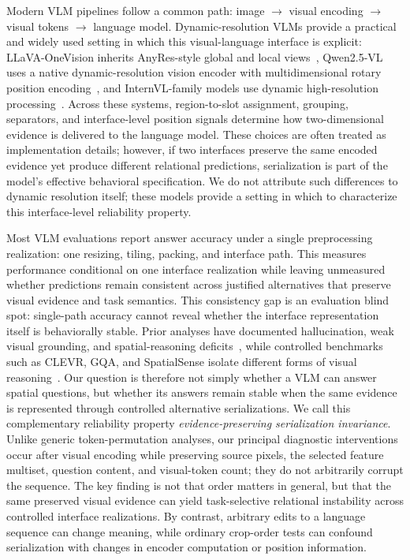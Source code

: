 \documentclass[10pt,twocolumn,letterpaper]{article}
\begin{document}
Modern VLM pipelines follow a common path: image $\rightarrow$ visual encoding $\rightarrow$ visual tokens $\rightarrow$ language model.
Dynamic-resolution VLMs provide a practical and widely used setting in which this visual-language interface is explicit: LLaVA-OneVision inherits AnyRes-style global and local views~\cite{li2024llavaonevision}, Qwen2.5-VL uses a native dynamic-resolution vision encoder with multidimensional rotary position encoding~\cite{bai2025qwen25vl}, and InternVL-family models use dynamic high-resolution processing~\cite{chen2024internvl}.
Across these systems, region-to-slot assignment, grouping, separators, and interface-level position signals determine how two-dimensional evidence is delivered to the language model.
These choices are often treated as implementation details; however, if two interfaces preserve the same encoded evidence yet produce different relational predictions, serialization is part of the model's effective behavioral specification.
We do not attribute such differences to dynamic resolution itself; these models provide a setting in which to characterize this interface-level reliability property.

Most VLM evaluations report answer accuracy under a single preprocessing realization: one resizing, tiling, packing, and interface path.
This measures performance conditional on one interface realization while leaving unmeasured whether predictions remain consistent across justified alternatives that preserve visual evidence and task semantics.
This consistency gap is an evaluation blind spot: single-path accuracy cannot reveal whether the interface representation itself is behaviorally stable.
Prior analyses have documented hallucination, weak visual grounding, and spatial-reasoning deficits~\cite{tong2024eyes,chen2024spatialvlm}, while controlled benchmarks such as CLEVR, GQA, and SpatialSense isolate different forms of visual reasoning~\cite{johnson2017clevr,hudson2019gqa,yang2019spatialsense}.
Our question is therefore not simply whether a VLM can answer spatial questions, but whether its answers remain stable when the same evidence is represented through controlled alternative serializations.
We call this complementary reliability property \emph{evidence-preserving serialization invariance}.
Unlike generic token-permutation analyses, our principal diagnostic interventions occur after visual encoding while preserving source pixels, the selected feature multiset, question content, and visual-token count; they do not arbitrarily corrupt the sequence.
The key finding is not that order matters in general, but that the same preserved visual evidence can yield task-selective relational instability across controlled interface realizations.
By contrast, arbitrary edits to a language sequence can change meaning, while ordinary crop-order tests can confound serialization with changes in encoder computation or position information.
\end{document}
